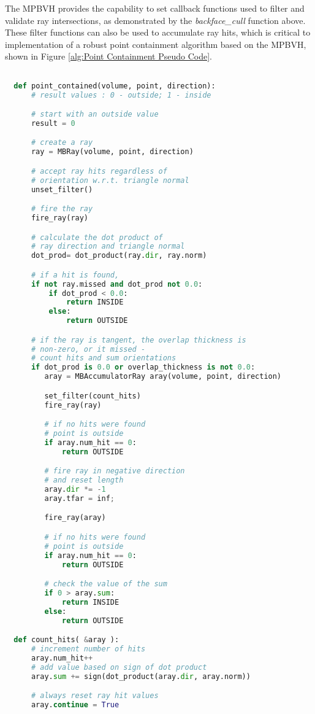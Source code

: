 The MPBVH provides the capability to set callback functions used to filter and
validate ray intersections, as demonstrated by the \textit{backface\_cull}
function above. These filter functions can also be used to accumulate ray hits,
which is critical to implementation of a robust point containment algorithm
based on the MPBVH, shown in Figure \ref{alg:Point Containment Pseudo Code}.

\begin{lstlisting}[language=Python,basicstyle=\tiny,caption={Algorithm for point containment within a volume.},
    label={alg:Point Containment Pseudo Code},captionpos=b]

  def point_contained(volume, point, direction):
      # result values : 0 - outside; 1 - inside

      # start with an outside value
      result = 0

      # create a ray
      ray = MBRay(volume, point, direction)

      # accept ray hits regardless of
      # orientation w.r.t. triangle normal
      unset_filter()

      # fire the ray
      fire_ray(ray)

      # calculate the dot product of
      # ray direction and triangle normal
      dot_prod= dot_product(ray.dir, ray.norm)

      # if a hit is found, 
      if not ray.missed and dot_prod not 0.0:
          if dot_prod < 0.0:
              return INSIDE
          else:
              return OUTSIDE

      # if the ray is tangent, the overlap thickness is
      # non-zero, or it missed - 
      # count hits and sum orientations
      if dot_prod is 0.0 or overlap_thickness is not 0.0:
         aray = MBAccumulatorRay aray(volume, point, direction)

         set_filter(count_hits)
         fire_ray(ray)

         # if no hits were found
         # point is outside
         if aray.num_hit == 0:
             return OUTSIDE

         # fire ray in negative direction
         # and reset length
         aray.dir *= -1
         aray.tfar = inf;

         fire_ray(aray)

         # if no hits were found
         # point is outside
         if aray.num_hit == 0:
             return OUTSIDE

         # check the value of the sum
         if 0 > aray.sum:
             return INSIDE
         else:
             return OUTSIDE

  def count_hits( &aray ):
      # increment number of hits
      aray.num_hit++
      # add value based on sign of dot product
      aray.sum += sign(dot_product(aray.dir, aray.norm))

      # always reset ray hit values
      aray.continue = True

\end{lstlisting}

